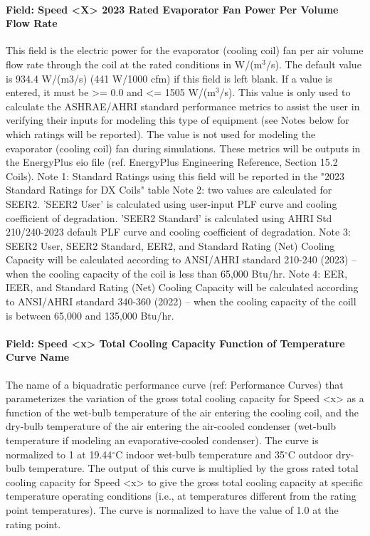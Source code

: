 \paragraph{Field: Speed \textless{}X\textgreater{} 2023 Rated Evaporator Fan Power Per Volume Flow Rate}

This field is the electric power for the evaporator (cooling coil) fan per air volume flow rate through the coil at the rated conditions in W/(m\(^{3}\)/s). The default value is 934.4 W/(m3/s) (441 W/1000 cfm) if this field is left blank. If a value is entered, it must be \textgreater{}= 0.0 and \textless{}= 1505 W/(m\(^{3}\)/s). This value is only used to calculate the ASHRAE/AHRI standard performance metrics to assist the user in verifying their inputs for modeling this type of equipment (see Notes below for which ratings will be reported).  The value is not used for modeling the evaporator (cooling coil) fan during simulations.  These metrics will be outputs in the EnergyPlus eio file (ref. EnergyPlus Engineering Reference, Section 15.2 Coils).
Note 1: Standard Ratings using this field will be reported in the "2023 Standard Ratings for DX Coils" table
Note 2: two values are calculated for SEER2. 'SEER2 User' is calculated using user-input PLF curve and cooling coefficient of degradation. 'SEER2 Standard' is calculated using AHRI Std 210/240-2023 default PLF curve and cooling coefficient of degradation.
Note 3: SEER2 User, SEER2 Standard, EER2, and Standard Rating (Net) Cooling Capacity will be calculated according to ANSI/AHRI standard 210-240 (2023) -- when the cooling capacity of the coil is less than 65,000 Btu/hr.
Note 4: EER, IEER, and Standard Rating (Net) Cooling Capacity will be calculated according to ANSI/AHRI standard 340-360 (2022) -- when the cooling capacity of the coill is between 65,000 and 135,000 Btu/hr.

\paragraph{Field: Speed \textless{}x\textgreater{} Total Cooling Capacity Function of Temperature Curve Name}\label{field-speed-x-total-cooling-capacity-function-of-temperature-curve-name}

The name of a biquadratic performance curve (ref: Performance Curves) that parameterizes the variation of the gross total cooling capacity for Speed \textless{}x\textgreater{} as a function of the wet-bulb temperature of the air entering the cooling coil, and the dry-bulb temperature of the air entering the air-cooled condenser (wet-bulb temperature if modeling an evaporative-cooled condenser). The curve is normalized to 1 at 19.44$^\circ$C indoor wet-bulb temperature and 35$^\circ$C outdoor dry-bulb temperature. The output of this curve is multiplied by the gross rated total cooling capacity for Speed \textless{}x\textgreater{} to give the gross total cooling capacity at specific temperature operating conditions (i.e., at temperatures different from the rating point temperatures). The curve is normalized to have the value of 1.0 at the rating point.

